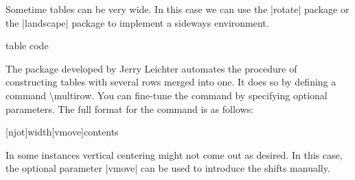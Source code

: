 \clearpage

\medskip

\begin{multicols}{2}
Sometime tables can be very wide. In this case we can use the |rotate| package or the |landscape| package to implement a sideways environment.

\begin{teX}
\begin{landscape}
  table code
\end{landscape}
\end{teX}
\end{multicols}




\clearpage


\begin{multicols}{2}
The  package developed by Jerry Leichter  automates the procedure of constructing tables with several rows merged into one. It does so by defining a command \textbackslash multirow. You can fine-tune the command by specifying optional parameters. The full format for the command is as follows:

\end{multicols}



\begin{teXXX}
[njot]{width}[vmove]{contents}
\end{teXXX}



\begin{multicols}{2}
In some instances vertical centering might not come out as desired. In this case, the optional parameter |vmove| can be used to introduce the shifts manually.

\end{multicols}



